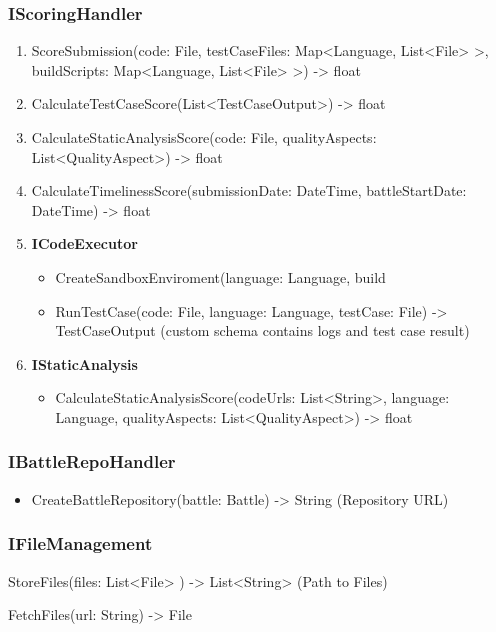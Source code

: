 \subsubsection{IScoringHandler}
\begin{enumerate}
   \item ScoreSubmission(code: File, testCaseFiles: Map<Language, List<File> >, buildScripts: Map<Language, List<File> >) -> float
  \item CalculateTestCaseScore(List<TestCaseOutput>) -> float
   \item CalculateStaticAnalysisScore(code: File, qualityAspects: List<QualityAspect>) -> float
   \item CalculateTimelinessScore(submissionDate: DateTime, battleStartDate: DateTime) -> float
   \item \textbf{ICodeExecutor}
   \begin{itemize}
        \item CreateSandboxEnviroment(language: Language, build
       \item RunTestCase(code: File, language: Language, testCase: File) -> TestCaseOutput (custom schema contains logs and test case result)
   \end{itemize}
   \item \textbf{IStaticAnalysis}
   \begin{itemize}
       \item CalculateStaticAnalysisScore(codeUrls: List<String>, language: Language, qualityAspects: List<QualityAspect>) -> float
   \end{itemize}
\end{enumerate}
\subsubsection{IBattleRepoHandler}
\begin{itemize}
    \item CreateBattleRepository(battle: Battle) -> String (Repository URL)
\end{itemize}
\subsubsection{IFileManagement}
\item StoreFiles(files: List<File> ) -> List<String> (Path to Files)
\item FetchFiles(url: String) -> File
